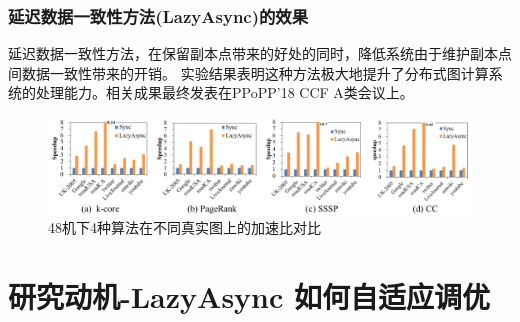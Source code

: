 \documentclass[10pt]{beamer}
\begin{document}
\begin{frame}%
  \frametitle{延迟数据一致性方法(LazyAsync)的效果}
  \vspace{-1em}
  延迟数据一致性方法，在保留副本点带来的好处的同时，降低系统由于维护副本点间数据一致性带来的开销。
  实验结果表明这种方法极大地提升了分布式图计算系统的处理能力。相关成果最终发表在PPoPP'18 CCF A类会议上。
  \vspace{-1em}
  \begin{figure}
    \includegraphics[scale=0.3]{Img/speedup.png}
    \caption{48机下4种算法在不同真实图上的加速比对比}  
  \end{figure}

\end{frame}

\section{研究动机-LazyAsync 如何自适应调优}
\end{document}
